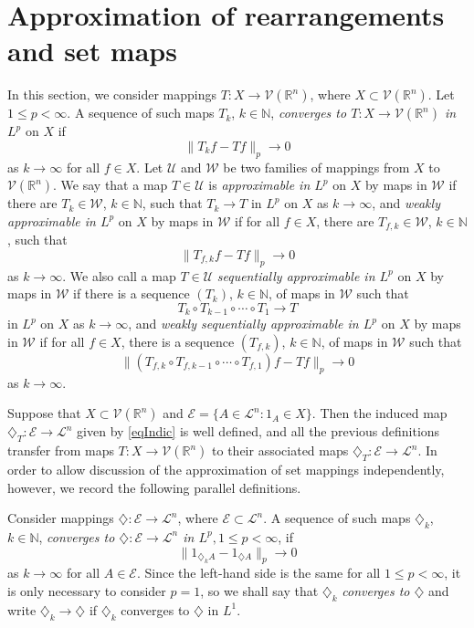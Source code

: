 \documentclass[12pt,reqno]{amsart}
\newcommand{\N}{{\mathbb N}}
\newcommand{\R}{{\mathbb R}}
\newcommand{\cL}{\mathcal L}
\newcommand{\cE}{{\mathcal E}}
\newcommand{\cV}{{\mathcal V}}
\newcommand{\cW}{{\mathcal W}}
\newcommand{\cU}{{\mathcal U}}
\newcommand{\di}{\diamondsuit}
\numberwithin{equation}{section}
\begin{document}
\section{Approximation of rearrangements and set maps}\label{Approxrearrange}

In this section, we consider mappings $T: X\to  {\cV}(\R^n)$, where $X\subset {\cV}(\R^n)$.  Let $1\le p< \infty$.  A sequence of such maps $T_k$, $k\in \N$, {\em converges to $T: X\to {\cV}(\R^n)$ in $L^p$} on $X$ if
\[
\|T_kf-Tf\|_p\to 0
\]
as $k\to\infty$ for all $f\in X$. Let $\cU$ and $\cW$ be two families of mappings from $X$ to ${\cV}(\R^n)$.  We say that a map $T\in\cU$ is {\em approximable in $L^p$} on $X$ by maps in $\cW$ if there are $T_k\in \cW$, $k\in \N$, such that $T_k\to T$ in $L^p$ on $X$ as $k\to \infty$, and {\em weakly approximable in $L^p$} on $X$ by maps in $\cW$ if for all $f\in X$, there are $T_{f,k}\in \cW$, $k\in \N$, such that
$$
\|T_{f,k}f-Tf\|_p\to 0
$$
as $k\to \infty$.  We also call a map $T\in\cU$ {\em sequentially approximable in $L^p$} on $X$ by maps in $\cW$ if there is a sequence $(T_k)$, $k\in \N$, of maps in $\cW$ such that
$$
T_k\circ T_{k-1}\circ \cdots\circ T_1\longrightarrow T
$$
in $L^p$ on $X$ as $k\to \infty$, and {\em weakly sequentially approximable in $L^p$} on $X$ by maps in $\cW$ if for all $f\in X$, there is a sequence $(T_{f,k})$, $k\in \N$, of maps in $\cW$ such that
$$
\|(T_{f,k}\circ T_{f,k-1}\circ \cdots\circ T_{f,1})f-Tf\|_p \to 0
$$
as $k\to \infty$.

Suppose that $X\subset {\cV}(\R^n)$ and $\cE=\{A\in \cL^n:1_A\in X\}$. Then the induced map $\di_T:\cE\to {\cL}^n$ given by \eqref{eqIndic} is well defined, and all the previous definitions transfer from maps $T:X\to {\cV}(\R^n)$ to their associated maps $\di_T:\cE\to {\cL}^n$.  In order to allow discussion of the approximation of set mappings independently, however, we record the following parallel definitions.

Consider mappings $\di: \cE\to\cL^n$, where $\cE\subset \cL^n$. A sequence of such maps $\di_k$, $k\in \N$, {\em converges to $\di: \cE\to\cL^n$ in $L^p, 1\le p< \infty$}, if
\[
\|1_{\di_k A}-1_{\di A}\|_p\to 0
\]
as $k\to\infty$ for all $A\in \cE$. Since the left-hand side is the same for all $1\le p<\infty$, it is only necessary to consider $p=1$, so we shall say that $\di_k$ {\em converges to $\di$} and write $\di_k\to \di$ if $\di_k$ converges to $\di$ in $L^1$.
\end{document}
